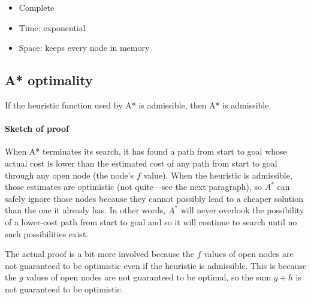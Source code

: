 \begin{itemize}
  \item Complete
  \item Time: exponential
  \item Space: keeps every node in memory
\end{itemize}


\subsection{A* optimality}

If the heuristic function used by A* is admissible, then A* is admissible. 

\paragraph{Sketch of proof} When A* terminates its search, 
it has found a path from start to goal whose actual cost is 
lower than the estimated cost of
any path from start to goal through any open node (the node's
$f$ value). 
When the heuristic is admissible, those estimates are
optimistic (not quite—see the next paragraph), so $A^{*}$ can
safely ignore those nodes because they cannot possibly lead
to a cheaper solution than the one it already has. 
In other words, $A^{*}$ will never overlook the
possibility of a lower-cost path from start to goal and so it
will continue to search until no such possibilities exist.

The actual proof is a bit more involved because the
$f$ values of open nodes are not guaranteed to
be optimistic even if the heuristic is admissible. This is
because the $g$ values of open nodes are not guaranteed to be
optimal, so the sum $g+h$ is not guaranteed to be optimistic.

